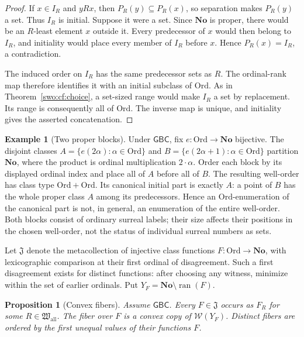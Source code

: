 \documentclass[11pt]{article}
\newtheorem{proposition}[proposition]{Proposition}
\theoremstyle{definition}
\newtheorem{example}[example]{Example}
\theoremstyle{remark}
\newcommand{\No}{\mathbf{No}}
\newcommand{\Ord}{\mathrm{Ord}}
\newcommand{\WO}{\mathcal W}
\newcommand{\Hall}{\mathfrak W_{\mathrm{all}}}
\newcommand{\Jinj}{\mathfrak J}
\newcommand{\GBC}{\mathsf{GBC}}
\begin{document}
\begin{proof}
If \(x\in I_R\) and \(yRx\), then \(P_R(y)\subseteq P_R(x)\),
so separation makes \(P_R(y)\) a set.  Thus \(I_R\) is initial.
Suppose it were a set.  Since \(\No\) is proper, there would be an
\(R\)-least element \(x\) outside it.  Every predecessor of \(x\)
would then belong to \(I_R\), and initiality would place every member
of \(I_R\) before \(x\).  Hence \(P_R(x)=I_R\), a contradiction.

The induced order on \(I_R\) has the same predecessor sets as \(R\).
The ordinal-rank map therefore identifies it with an initial subclass of
\(\Ord\).  As in Theorem~\ref{swo:cf:choice}, a set-sized range would make
\(I_R\) a set by replacement.  Its range is consequently all of
\(\Ord\).  The inverse map is unique, and initiality gives the asserted
concatenation.
\end{proof}

\begin{example}[Two proper blocks]
\label{swo:cf:two_blocks}
Under \(\GBC\), fix \(e:\Ord\to\No\) bijective.  The disjoint classes
\(A=\{e(2\alpha):\alpha\in\Ord\}\) and
\(B=\{e(2\alpha+1):\alpha\in\Ord\}\) partition \(\No\), where the
product is ordinal multiplication \(2\cdot\alpha\).  Order each block
by its displayed ordinal index and place all of \(A\) before all of
\(B\).  The resulting well-order has class type \(\Ord+\Ord\).
Its canonical initial part is exactly \(A\): a point of \(B\) has
the whole proper class \(A\) among its predecessors.  Hence an
\(\Ord\)-enumeration of the canonical part is not, in general, an
enumeration of the entire well-order.  Both blocks consist of ordinary
surreal labels; their size affects their positions in the chosen well-order,
not the status of individual surreal numbers as sets.
\end{example}

Let \(\Jinj\) denote the metacollection of injective class functions
\(F:\Ord\to\No\), with lexicographic comparison at their first ordinal
of disagreement.  Such a first disagreement exists for distinct functions:
after choosing any witness, minimize within the set of earlier ordinals.
Put \(Y_F=\No\setminus\operatorname{ran}(F)\).

\begin{proposition}[Convex fibers]
\label{swo:cf:fibers}
Assume \(\GBC\).  Every \(F\in\Jinj\) occurs as \(F_R\) for some
\(R\in\Hall\).  The fiber over \(F\) is a convex copy of
\(\WO(Y_F)\).  Distinct fibers are ordered by the first unequal values
of their functions \(F\).
\end{proposition}
\end{document}
